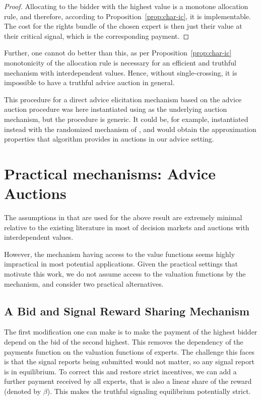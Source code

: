 \begin{proof}
Allocating to the bidder with the highest value is a monotone allocation rule, and therefore, according to Proposition~\ref{prop:char-ic}, it is implementable. The cost for the rights bundle of the chosen expert is then just their value at their critical signal, which is the corresponding payment.
\end{proof}

Further, one cannot do better than this, as per Proposition~\ref{prop:char-ic} monotonicity of the allocation rule is necessary for an efficient and truthful mechanism with interdependent values. Hence, without single-crossing, it is impossible to have a truthful advice auction in general.

This procedure for a direct advice elicitation mechanism based on the advice auction procedure was here instantiated using \citep{maskin1992auctions}  as the underlying auction mechanism, but the procedure is generic. It could be, for example, instantiated instead with the randomized mechanism of \citep{eden2018interdependent}, and would obtain the approximation properties that algorithm provides in auctions in our advice setting.


\section{Practical mechanisms: Advice Auctions}

The assumptions in \citep{roughgarden2016optimal} that are used for the above result are extremely minimal relative to the existing literature in most of decision markets and auctions with interdependent values.

However, the mechanism having access to the value functions seems highly impractical in most potential applications.
Given the practical settings that motivate this work, 
we do not assume access to the valuation functions by the mechanism, and consider two practical alternatives.


\subsection{A Bid and Signal Reward Sharing Mechanism}

The first modification one can make is to make the payment of the highest bidder depend on the bid of the second highest. This removes the dependency of the payments function on the valuation functions of experts.
The challenge this faces is that the signal reports being submitted would not matter, so any signal report is in equilibrium. To correct this and restore strict incentives, we can add a further payment received by all experts, that is also a linear share of the reward (denoted by $\beta$). This makes the truthful signaling equilibrium potentially strict.


